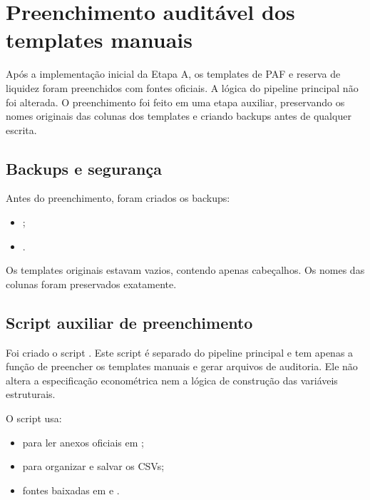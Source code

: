 \documentclass[12pt,a4paper]{article}
\begin{document}
\section{Preenchimento auditável dos templates manuais}\label{app:templates}

Após a implementação inicial da Etapa A, os templates de PAF e reserva de liquidez
foram preenchidos com fontes oficiais. A lógica do pipeline principal não foi
alterada. O preenchimento foi feito em uma etapa auxiliar, preservando os nomes
originais das colunas dos templates e criando backups antes de qualquer escrita.

\subsection{Backups e segurança}

Antes do preenchimento, foram criados os backups:

\begin{itemize}[leftmargin=1.2cm]
    \item {};
    \item {}.
\end{itemize}

Os templates originais estavam vazios, contendo apenas cabeçalhos. Os nomes das
colunas foram preservados exatamente.

\subsection{Script auxiliar de preenchimento}

Foi criado o script . Este script é
separado do pipeline principal e tem apenas a função de preencher os templates
manuais e gerar arquivos de auditoria. Ele não altera a especificação econométrica
nem a lógica de construção das variáveis estruturais.

O script usa:

\begin{itemize}[leftmargin=1.2cm]
    \item {} para ler anexos oficiais em ;
    \item {} para organizar e salvar os CSVs;
    \item fontes baixadas em  e
    .
\end{itemize}
\end{document}
